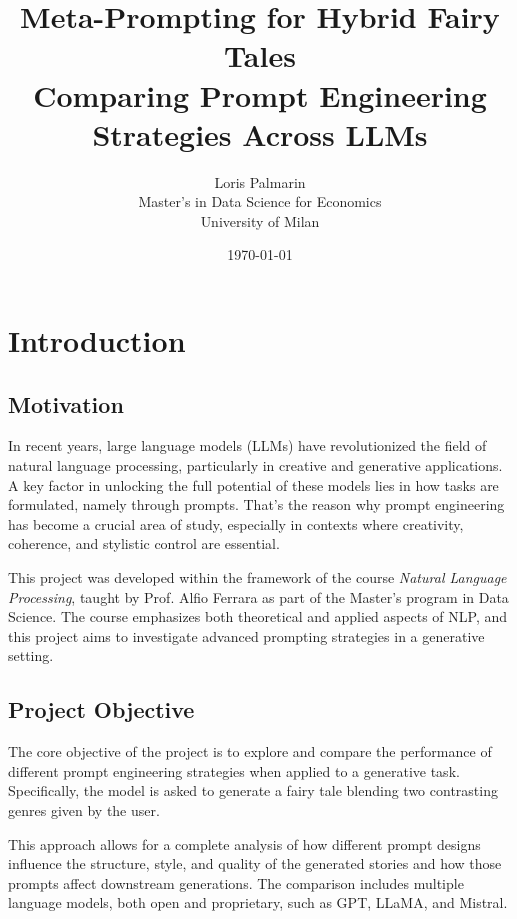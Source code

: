 \documentclass[12pt]{article}
\title{\textbf{Meta-Prompting for Hybrid Fairy Tales}\\
\large Comparing Prompt Engineering Strategies Across LLMs}
\author{Loris Palmarin \\
Master's in Data Science for Economics \\
University of Milan}
\date{\today}
\begin{document}
\begin{titlepage}
    \centering
 
    \maketitle

\end{titlepage}
\tableofcontents
\newpage

\section{Introduction}

\subsection{Motivation}

In recent years, large language models (LLMs) have revolutionized the field of natural language processing, particularly in creative and generative applications. A key factor in unlocking the full potential of these models lies in how tasks are formulated, namely through prompts. That's the reason why prompt engineering has become a crucial area of study, especially in contexts where creativity, coherence, and stylistic control are essential.

This project was developed within the framework of the course \textit{Natural Language Processing}, taught by Prof. Alfio Ferrara as part of the Master's program in Data Science. The course emphasizes both theoretical and applied aspects of NLP, and this project aims to investigate advanced prompting strategies in a generative setting.

\subsection{Project Objective}

The core objective of the project is to explore and compare the performance of different prompt engineering strategies when applied to a generative task. Specifically, the model is asked to generate a fairy tale blending two contrasting genres given by the user.

This approach allows for a complete analysis of how different prompt designs influence the structure, style, and quality of the generated stories and how those prompts affect downstream generations. The comparison includes multiple language models, both open and proprietary, such as GPT, LLaMA, and Mistral.
\end{document}
